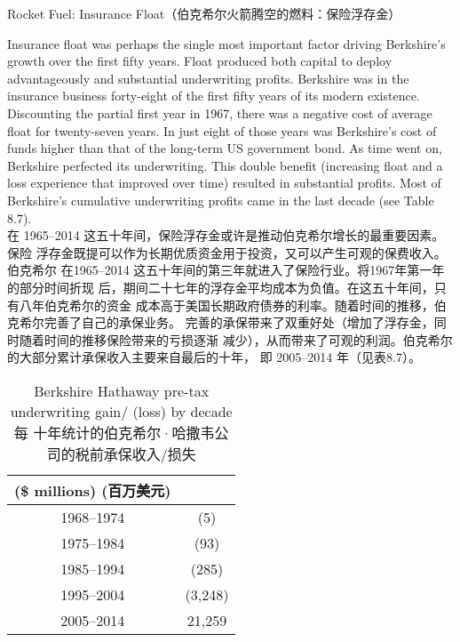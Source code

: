 \begin{section}{Rocket Fuel: Insurance Float（伯克希尔火箭腾空的燃料：保险浮存金）}
\begin{verseparallel}
  {
    Insurance float was perhaps the single most important factor driving
    Berkshire's growth over the first fifty years. Float produced both capital
    to deploy advantageously and substantial underwriting profits. Berkshire was
    in the insurance business forty-eight of the first fifty years of its modern
    existence. Discounting the partial first year in 1967, there was a negative
    cost of average float for twenty-seven years. In just eight of those years
    was Berkshire's cost of funds higher than that of the long-term US
    government bond. As time went on, Berkshire perfected its underwriting. This
    double benefit (increasing float and a loss experience that improved over
    time) resulted in substantial profits. Most of Berkshire's cumulative
    underwriting profits came in the last decade (see Table 8.7). \\
  }
  {
    在 1965--2014 这五十年间，保险浮存金或许是推动伯克希尔增长的最重要因素。保险
    浮存金既提可以作为长期优质资金用于投资，又可以产生可观的保费收入。伯克希尔
    在1965--2014 这五十年间的第三年就进入了保险行业。将1967年第一年的部分时间折现
    后，期间二十七年的浮存金平均成本为负值。在这五十年间，只有八年伯克希尔的资金
    成本高于美国长期政府债券的利率。随着时间的推移，伯克希尔完善了自己的承保业务。
    完善的承保带来了双重好处（增加了浮存金，同时随着时间的推移保险带来的亏损逐渐
    减少），从而带来了可观的利润。伯克希尔的大部分累计承保收入主要来自最后的十年，
    即 2005--2014 年（见表8.7）。
  }
\end{verseparallel}

\begin{table}[!htbp]
  \centering
  \begin{center}
    \begin{tabular}{cc}
      \toprule
      \makecell[c]{(\$ millions) \\ (百万美元)} & \\
      \midrule
      1968--1974 & (5) \\
      1975--1984 & (93) \\
      1985--1994 & (285) \\
      1995--2004 & (3,248) \\
      2005--2014 & 21,259 \\
      \bottomrule
    \end{tabular}
    \caption{Berkshire Hathaway pre-tax underwriting gain/ (loss) by decade \\ 每
      十年统计的伯克希尔·哈撒韦公司的税前承保收入/损失}
  \end{center}
\end{table}

{\color{red}{此处缺图 8.1}} \\

\end{section}

